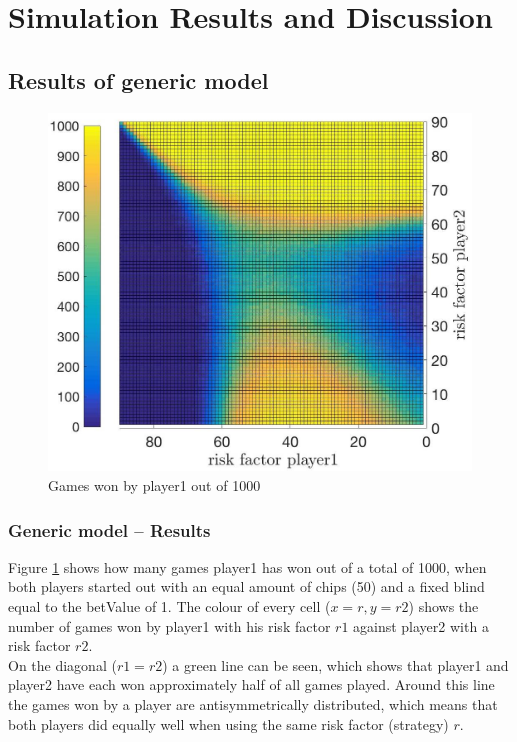 \documentclass[11pt]{article}
\begin{document}
\section{Simulation Results and Discussion}

\subsection{Results of generic model}

\begin{figure}
\begin{center}
\includegraphics[scale=0.2]{Graphics/allDataPlot_BlindOn_1000Games_001Step_TopFlat.jpg}
\caption{Games won by player1 out of 1000\label{Topview of all Data}}
\end{center}
\end{figure}

\subsubsection{Generic model -- Results }
Figure \ref{Topview of all Data} shows how many games player1 has won out of a total of 1000, when both players started out with an equal amount of chips (50) and a fixed blind equal to the betValue of 1. The colour of every cell ($x=r, y=r2$) shows the number of games won by player1 with his risk factor $r1$ against player2 with a risk factor $r2$.\\
% 

On the diagonal ($r1=r2$) a green line can be seen, which shows that player1 and player2 have each won approximately half of all games played. Around this line the games won by a player are antisymmetrically distributed, which means that both players did equally well when using the same risk factor (strategy) $r$.\\
\end{document}

